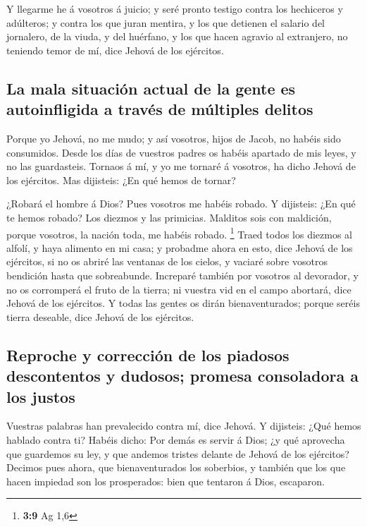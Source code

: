  Y llegarme he á vosotros á juicio; y seré pronto testigo
contra los hechiceros y adúlteros; y contra los que juran mentira, y los
que detienen el salario del jornalero, de la viuda, y del huérfano, y
los que hacen agravio al extranjero, no teniendo temor de mí, dice
Jehová de los ejércitos.

\hypertarget{la-mala-situaciuxf3n-actual-de-la-gente-es-autoinfligida-a-travuxe9s-de-muxfaltiples-delitos}{%
\subsection{La mala situación actual de la gente es autoinfligida a
través de múltiples
delitos}\label{la-mala-situaciuxf3n-actual-de-la-gente-es-autoinfligida-a-travuxe9s-de-muxfaltiples-delitos}}

 Porque yo Jehová, no me mudo; y así vosotros, hijos de
Jacob, no habéis sido consumidos.  Desde los días de
vuestros padres os habéis apartado de mis leyes, y no las guardasteis.
Tornaos á mí, y yo me tornaré á vosotros, ha dicho Jehová de los
ejércitos. Mas dijisteis: ¿En qué hemos de tornar?

 ¿Robará el hombre á Dios? Pues vosotros me habéis robado. Y
dijisteis: ¿En qué te hemos robado? Los diezmos y las primicias.
 Malditos sois con maldición, porque vosotros, la nación
toda, me habéis robado. \footnote{\textbf{3:9} Ag 1,6} 
Traed todos los diezmos al alfolí, y haya alimento en mi casa; y
probadme ahora en esto, dice Jehová de los ejércitos, si no os abriré
las ventanas de los cielos, y vaciaré sobre vosotros bendición hasta que
sobreabunde.  Increparé también por vosotros al devorador,
y no os corromperá el fruto de la tierra; ni vuestra vid en el campo
abortará, dice Jehová de los ejércitos.  Y todas las gentes
os dirán bienaventurados; porque seréis tierra deseable, dice Jehová de
los ejércitos.

\hypertarget{reproche-y-correcciuxf3n-de-los-piadosos-descontentos-y-dudosos-promesa-consoladora-a-los-justos}{%
\subsection{Reproche y corrección de los piadosos descontentos y
dudosos; promesa consoladora a los
justos}\label{reproche-y-correcciuxf3n-de-los-piadosos-descontentos-y-dudosos-promesa-consoladora-a-los-justos}}

 Vuestras palabras han prevalecido contra mí, dice Jehová.
Y dijisteis: ¿Qué hemos hablado contra ti?  Habéis dicho:
Por demás es servir á Dios; ¿y qué aprovecha que guardemos su ley, y que
andemos tristes delante de Jehová de los ejércitos? 
Decimos pues ahora, que bienaventurados los soberbios, y también que los
que hacen impiedad son los prosperados: bien que tentaron á Dios,
escaparon.

